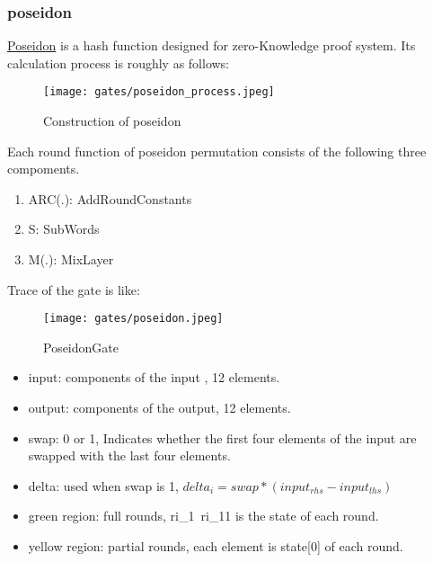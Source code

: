 \subsubsection{poseidon}

\href{https://www.poseidon-hash.info/}{Poseidon} is a hash function designed for zero-Knowledge proof system.
Its calculation process is roughly as follows:

\begin{figure}[!ht]
    \centering
    \texttt{[image: gates/poseidon\_process.jpeg]}
    \caption{Construction of poseidon}
    \label{fig:poseidon-process}
\end{figure}

Each round function of poseidon permutation consists of the following three compoments.
\begin{enumerate}
    \item ARC(.): AddRoundConstants
    \item S: SubWords
    \item M(.): MixLayer
\end{enumerate}

Trace of the gate is like:
\begin{figure}[!ht]
    \centering
    \texttt{[image: gates/poseidon.jpeg]}
    \caption{PoseidonGate}
    \label{fig:poseidon-gate}
\end{figure}

\begin{itemize}
    \item input: components of the input , 12 elements.
    \item output: components of the output, 12 elements.
    \item swap: 0 or 1, Indicates whether the first four elements of the input are swapped with the last four elements.
    \item delta: used when swap is 1, $delta_i = swap * (input_{rhs} - input_{lhs})$
    \item green region: full rounds, ri\_1~ri\_11 is the state of each round.
    \item yellow region: partial rounds, each element is state[0] of each round.
\end{itemize}

